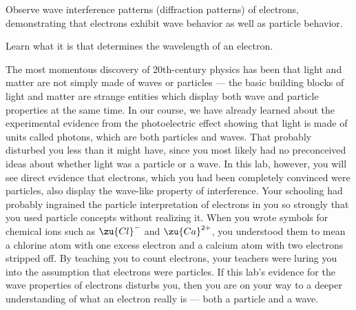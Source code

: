\label{lab:electron-diffraction}

\apparatus



\begin{goals}

\item[] Observe wave interference patterns (diffraction patterns)
of electrons, demonstrating that electrons exhibit wave
behavior as well as particle behavior.

\item[] Learn what it is that determines the wavelength of an electron.
\end{goals}

\introduction


The most momentous discovery of 20th-century physics has
been that light and matter are not simply made of waves or
particles --- the basic building blocks of light and matter
are strange entities which display both wave and particle
properties at the same time. In our course, we have already
learned about the experimental evidence from the photoelectric
effect showing that light is made of units called photons,
which are both particles and waves. That probably disturbed
you less than it might have, since you most likely had no
preconceived ideas about whether light was a particle or a
wave. In this lab, however, you will see direct evidence
that electrons, which you had been completely convinced were
particles, also display the wave-like property of interference.
Your schooling had probably ingrained the particle
interpretation of electrons in you so strongly that you used
particle concepts without realizing it. When you wrote
symbols for chemical ions such as $\zu{Cl}^{-}$ and $\zu{Ca}^{2+}$, you
understood them to mean a chlorine atom with one excess
electron and a calcium atom with two electrons stripped off.
By teaching you to count electrons, your teachers were
luring you into the assumption that electrons were
particles. If this lab's evidence for the wave properties of
electrons disturbs you, then you are on your way to a deeper
understanding of what an electron really is --- both a
particle and a wave.


